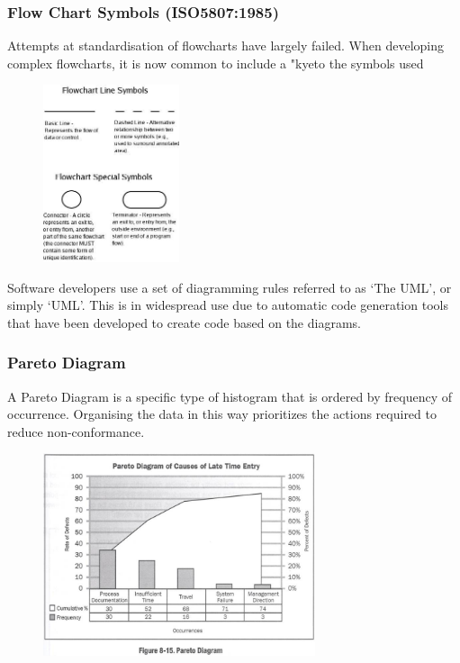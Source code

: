 \begin{frame}
\frametitle{Flow Chart Symbols  (ISO5807:1985) }
Attempts at standardisation of flowcharts have largely failed.
When developing complex flowcharts, it is now common to include a "kyeto the symbols used
\begin{figure}
	\centering
		\includegraphics[width = 4cm]{images/flow3.jpg}
	\label{fig:flow3}
\end{figure}
\end{frame}

Software developers use a set of diagramming rules referred to as `The UML', or simply `UML'.  This is in widespread use due to automatic code generation tools that have been developed to create code based on the diagrams.


\begin{frame}
\frametitle{Pareto Diagram}
A Pareto Diagram is a specific type of histogram that is ordered by frequency of occurrence.
Organising the data in this way prioritizes the actions required to reduce non-conformance.
\begin{figure}
	\centering
		\includegraphics[width = 8cm]{images/pareto.jpg}
	\label{fig:pareto}
\end{figure}

\end{frame}




